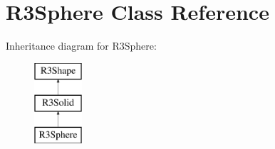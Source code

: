 \hypertarget{class_r3_sphere}{}\section{R3\+Sphere Class Reference}
\label{class_r3_sphere}
Inheritance diagram for R3\+Sphere\+:\begin{figure}[H]
\begin{center}
\leavevmode
\includegraphics[height=3.000000cm]{class_r3_sphere}
\end{center}
\end{figure}
